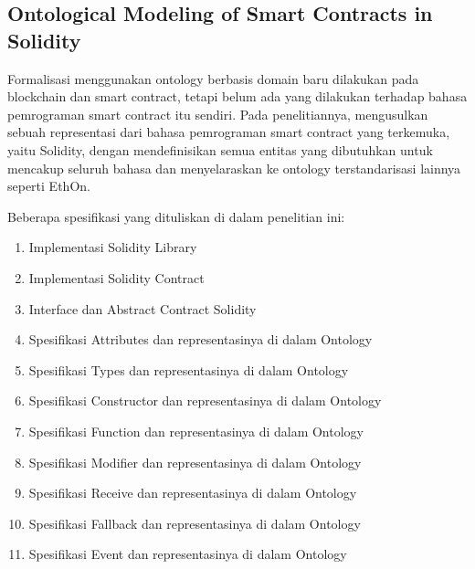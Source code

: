 \subsection{Ontological Modeling of Smart Contracts in Solidity}
\label{subsec:solidity-ontology}

Formalisasi menggunakan ontology berbasis domain baru dilakukan pada blockchain dan smart contract, tetapi belum ada yang dilakukan terhadap bahasa pemrograman smart contract itu sendiri. Pada penelitiannya, \cite{cano2021toward} mengusulkan sebuah representasi dari bahasa pemrograman smart contract yang terkemuka, yaitu Solidity, dengan mendefinisikan semua entitas yang dibutuhkan untuk mencakup seluruh bahasa dan menyelaraskan ke ontology terstandarisasi lainnya seperti EthOn.

Beberapa spesifikasi yang dituliskan di dalam penelitian ini:

\begin{enumerate}
  \item Implementasi Solidity Library
  \item Implementasi Solidity Contract
  \item Interface dan Abstract Contract Solidity
  \item Spesifikasi Attributes dan representasinya di dalam Ontology 
  \item Spesifikasi Types dan representasinya di dalam Ontology
  \item Spesifikasi Constructor dan representasinya di dalam Ontology
  \item Spesifikasi Function dan representasinya di dalam Ontology
  \item Spesifikasi Modifier dan representasinya di dalam Ontology
  \item Spesifikasi Receive dan representasinya di dalam Ontology
  \item Spesifikasi Fallback dan representasinya di dalam Ontology
  \item Spesifikasi Event dan representasinya di dalam Ontology
\end{enumerate}